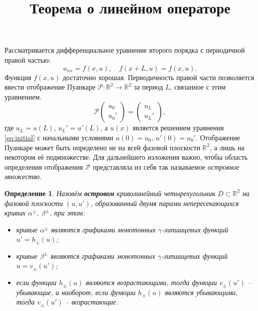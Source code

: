 \documentclass{article}
\newtheorem*{definition}{Определение}
\begin{document}
\title{Теорема о линейном операторе}

\maketitle

Рассматривается дифференциальное уравнение второго порядка с периодичной правой частью:
\begin{equation}
	u_{xx} = f(x, u), \quad f(x + L, u) = f(x, u).
\label{eq:initial}
\end{equation}
Функция $f(x, u)$ достаточно хорошая.
Периодичность правой части позволяется ввести отображение Пуанкаре $\mathcal{P}: \mathbb{R}^2 \to \mathbb{R}^2$ за период $L$, связанное с этим уравнением.
\begin{equation}
	\mathcal{P} \begin{pmatrix} u_0 \\ u_0' \end{pmatrix}
	= \begin{pmatrix} u_L \\ u_L' \end{pmatrix},
\end{equation}
где $u_L = u(L)$, $u_L' = u'(L)$, а $u(x)$ является решением уравнения \eqref{eq:initial} с начальными условиями $u(0) = u_0$, $u'(0) = u_0'$.
Отображение Пуанкаре может быть определено не на всей фазовой плоскости $\mathbb{R}^2$, а лишь на некотором её подмножестве.
Для дальнейшего изложения важно, чтобы область определения отображения $\mathcal{P}$ представляла из себя так называемое {\it островное множество}.

\begin{definition}
	Назовём {\bf островом} криволинейный четырехугольник $D \subset \mathbb{R}^2$ на фазовой плоскости $(u, u')$, образованный двумя парами непересекающихся кривых $\alpha^{\pm}$, $\beta^{\pm}$, при этом:
	\begin{itemize}
		\item кривые $\alpha^{\pm}$ являются графиками монотонных $\gamma$-липшицевых функций $u' = h_{\pm}(u)$;
		\item кривые $\beta^{\pm}$ являются графиками монотонных $\gamma$-липшицевых функций $u = v_{\pm}(u')$;
		\item если функции $h_{\pm}(u)$ являются возрастающими, тогда функции $v_{\pm}(u')$ -- убывающие, и наоборот, если функции $h_{\pm}(u)$ являются убывающими, тогда $v_{\pm}(u')$ -- возрастающие.
	\end{itemize}
\end{definition}
\end{document}
